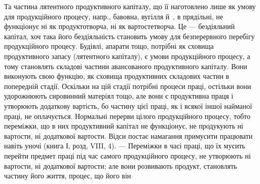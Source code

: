 Та частина лятентного продуктивного капіталу, що її наготовлено
лише як умову для продукційного процесу, напр., бавовна, вугілля й~, в прядільні, не функціонує ні як продуктотворча, ні як вартостетворча.
Це — бездіяльний капітал, хоч така його бездіяльність становить
умову для безперервного перебігу продукційного процесу. Будівлі, апарати
тощо, потрібні як сховища продуктивного запасу (лятентного капіталу),
є умови продукційного процесу, а тому становлять складові частини авансованого
продуктивного капіталу. Вони виконують свою функцію, як сховища
продуктивних складових частин в попередній стадії. Оскільки на цій стадії
потрібні процеси праці, остільки вони удорожнюють сировинний матеріял
тощо, але вони є продуктивна праця і утворюють додаткову
вартість, бо частину цієї праці, як і всякої іншої найманої праці, не
оплачується. Нормальні перерви цілого продукційного процесу, тобто
переміжки, що в них продуктивний капітал не функціонує, не продукують
ні вартости, ні додаткової вартости. Відси постає намагання примусити
працювати навіть уночі (книга І, розд, VIII, 4). — Переміжки в часі праці,
що їх мусить перейти предмет праці під час самого продукційного процесу,
не утворюють ні вартости, ні додаткової вартости; але вони розвивають
продукт, становлять частину його життя, процес, що його він
\parbreak{}  %
